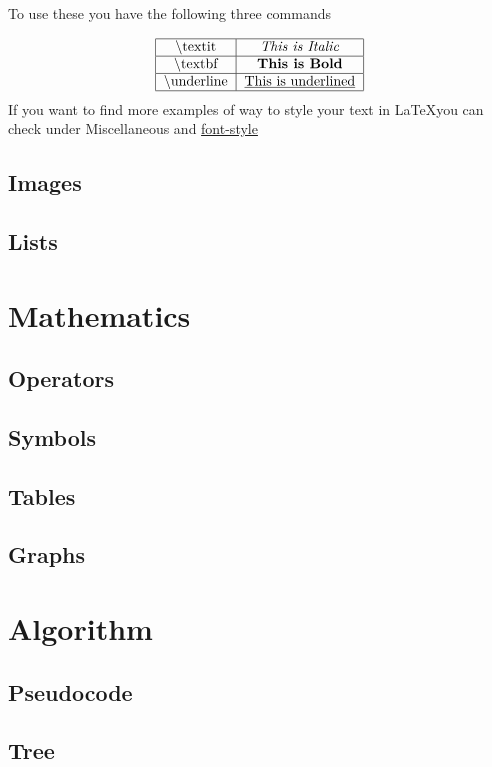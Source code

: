 \documentclass{article}
\newcommand{\bs}[1]{\textbackslash\text{#1}} %
\begin{document}
To use these you have the following three commands

\begin{align*}
    \begin{tabular}{|c|c|} \hline
       \bs{textit} & \textit{This is Italic} \\ \hline
       \bs{textbf} & \textbf{This is Bold} \\ \hline
       \bs{underline} & \underline{This is underlined} \\ \hline
    \end{tabular}
\end{align*}
If you want to find more examples of way to style your text in \LaTeX you can check under Miscellaneous and \hyperref[secc:font-style-sheet]{font-style}

\subsection{Images}
\subsection{Lists}

\newpage

\section{Mathematics}
\subsection{Operators}
\subsection{Symbols}
\subsection{Tables}
\subsection{Graphs}
\newpage

\section{Algorithm}
\subsection{Pseudocode}
\subsection{Tree}
\newpage
\end{document}
